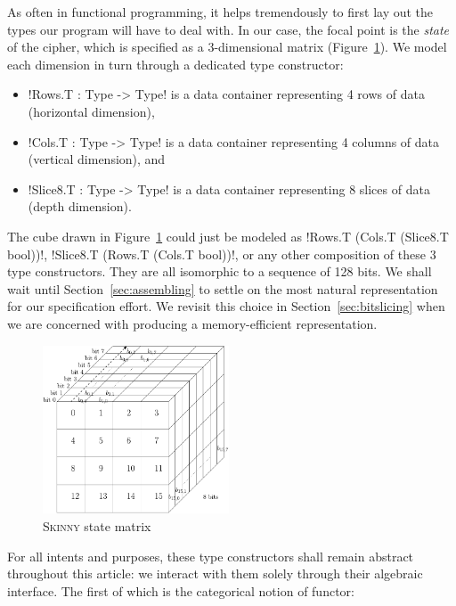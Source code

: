 \documentclass[draft,english]{jflart}
\newcommand{\Skinny}{\textsc{Skinny}}
\begin{document}
As often in functional programming, it helps tremendously to first lay
out the types our program will have to deal with. In our case, the
focal point is the \emph{state} of the cipher, which is specified as a
3-dimensional matrix (Figure~\ref{fig:state}). We model each dimension
in turn through a dedicated type constructor:
%
\begin{itemize}[nosep]
\item \coqe!Rows.T : Type -> Type! is a data container representing 4 rows of data (horizontal dimension),
\item \coqe!Cols.T : Type -> Type! is a data container representing 4 columns of data (vertical dimension), and
\item \coqe!Slice8.T : Type -> Type! is a data container representing
  8 slices of data (depth dimension).
\end{itemize}

The cube drawn in Figure~\ref{fig:state} could just be modeled as
%
\coqe!Rows.T (Cols.T (Slice8.T bool))!,
%
\coqe!Slice8.T (Rows.T (Cols.T bool))!,
%
or any other composition of these 3 type constructors. They are all
isomorphic to a sequence of 128 bits. We shall wait until
Section~\ref{sec:assembling} to settle on the most natural
representation for our specification effort. We revisit this choice in
Section~\ref{sec:bitslicing} when we are concerned with producing a
memory-efficient representation.

\begin{figure}
  \begin{center}
    \includegraphics[draft=false,height=5cm]{skinny_state}
  \end{center}
  \caption{\Skinny{} state matrix}
  \label{fig:state}
\end{figure}



For all intents and purposes, these type constructors shall remain
abstract throughout this article: we interact with them solely through
their algebraic interface. The first of which is the categorical
notion of functor:
%
\end{document}
